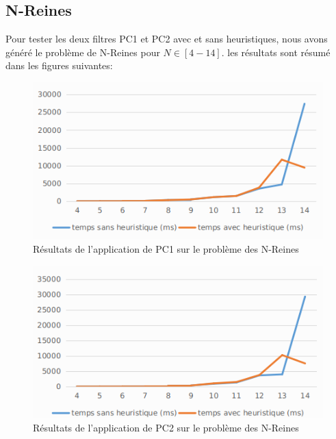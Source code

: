 \documentclass[12pt]{report}
\begin{document}
\subsection{N-Reines}
Pour tester les deux filtres PC1 et PC2 avec et sans heuristiques, nous avons généré le problème de N-Reines pour $N \in [4-14]$. les résultats sont résumé dans les figures suivantes:
\begin{figure}[H]
	\centering
	\includegraphics[scale=0.5]{imgs/queen1.png}
	\caption{Résultats de l'application de PC1 sur le problème des N-Reines }
	\label{fig:QueenPC1}
\end{figure}
\begin{figure}[H]
	\centering
	\includegraphics[scale=0.5]{imgs/queen2.png}
	\caption{Résultats de l'application de PC2 sur le problème des N-Reines}
	\label{fig:QueenPC2}
\end{figure}
\end{document}
